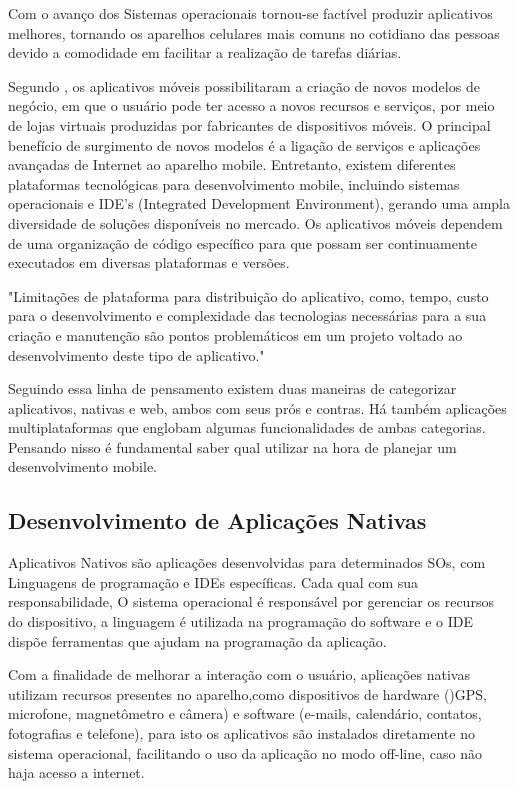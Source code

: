 	Com o avanço dos Sistemas operacionais tornou-se factível produzir aplicativos melhores, tornando os aparelhos celulares mais comuns no cotidiano das pessoas devido a comodidade em facilitar a realização de tarefas diárias.
	
	Segundo , os aplicativos móveis possibilitaram a criação de novos modelos de negócio, em que o usuário pode ter acesso a novos recursos e serviços, por meio de lojas virtuais produzidas por fabricantes de dispositivos móveis. O principal benefício de surgimento de novos modelos é a ligação de serviços e aplicações avançadas de Internet ao aparelho mobile. Entretanto, existem diferentes plataformas tecnológicas para desenvolvimento mobile, incluindo sistemas operacionais e IDE's  (Integrated Development Environment), gerando uma ampla diversidade de soluções disponíveis no mercado. Os aplicativos móveis dependem de uma organização de código específico para que possam ser continuamente executados em diversas plataformas e versões.
	
	\begin{citacao}
		"Limitações de plataforma para distribuição do aplicativo, como, tempo, custo para o desenvolvimento e complexidade das tecnologias necessárias para a sua criação e manutenção são pontos problemáticos em um projeto voltado ao desenvolvimento deste tipo de aplicativo."\cite{emdesafios}
	\end{citacao}
	
	
	Seguindo essa linha de pensamento existem duas maneiras de categorizar
	aplicativos, nativas e web, ambos com seus prós e contras. Há também aplicações multiplataformas que englobam algumas funcionalidades de ambas categorias. Pensando nisso é fundamental saber qual utilizar na hora de planejar um desenvolvimento mobile.
	
	\subsection{Desenvolvimento de Aplicações Nativas}
	
		Aplicativos Nativos são aplicações desenvolvidas para determinados SOs, com Linguagens de programação e IDEs específicas. Cada qual com sua responsabilidade, O sistema operacional é responsável por gerenciar os recursos do dispositivo, a linguagem é utilizada na programação do software e o IDE dispõe ferramentas que ajudam na programação da aplicação.
		
		Com a finalidade de melhorar a interação com o usuário, aplicações nativas utilizam recursos presentes no aparelho,como dispositivos de hardware ()GPS, microfone, magnetômetro e câmera) e software (e-mails,  calendário, contatos, fotografias e telefone), para isto os aplicativos são instalados diretamente no sistema operacional, facilitando o uso da aplicação no modo off-line, caso não haja acesso a internet.\cite{toledo2016desenvolvimento}
		
